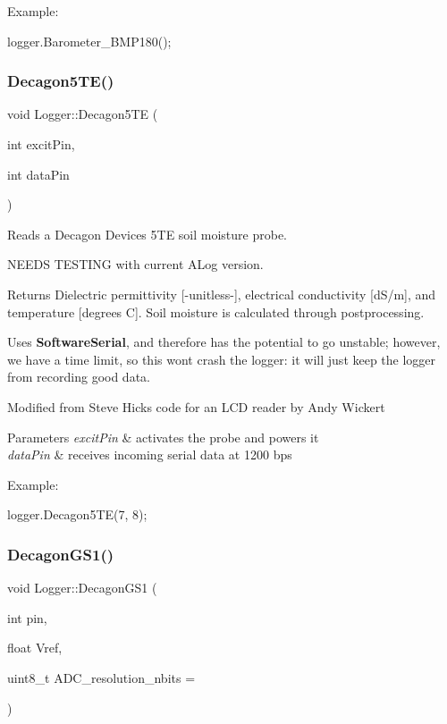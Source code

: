 Example\+: 
\begin{DoxyCode}
logger.Barometer\_BMP180();
\end{DoxyCode}
\mbox{\label{classLogger_a40ae372dee7f672a6d6f33ab441e4da1}} 
\subsubsection{\texorpdfstring{Decagon5\+T\+E()}{Decagon5TE()}}
{\footnotesize\ttfamily void Logger\+::\+Decagon5\+TE (\begin{DoxyParamCaption}\item[{int}]{excit\+Pin,  }\item[{int}]{data\+Pin }\end{DoxyParamCaption})}

Reads a Decagon Devices 5\+TE soil moisture probe.

N\+E\+E\+DS T\+E\+S\+T\+I\+NG with current A\+Log version.

Returns Dielectric permittivity \mbox{[}-\/unitless-\/\mbox{]}, electrical conductivity \mbox{[}d\+S/m\mbox{]}, and temperature \mbox{[}degrees C\mbox{]}. Soil moisture is calculated through postprocessing.

Uses {\bfseries Software\+Serial}, and therefore has the potential to go unstable; however, we have a time limit, so this won\textquotesingle{}t crash the logger\+: it will just keep the logger from recording good data.

Modified from Steve Hicks\textquotesingle{} code for an L\+CD reader by Andy Wickert


\begin{DoxyParams}{Parameters}
{\em excit\+Pin} & activates the probe and powers it\\
\hline
{\em data\+Pin} & receives incoming serial data at 1200 bps\\
\hline
\end{DoxyParams}
Example\+: 
\begin{DoxyCode}
logger.Decagon5TE(7, 8);
\end{DoxyCode}
\mbox{\label{classLogger_a84da6a9ec3d4d56fdc32d950b71f1a26}} 
\subsubsection{\texorpdfstring{Decagon\+G\+S1()}{DecagonGS1()}}
{\footnotesize\ttfamily void Logger\+::\+Decagon\+G\+S1 (\begin{DoxyParamCaption}\item[{int}]{pin,  }\item[{float}]{Vref,  }\item[{uint8\+\_\+t}]{A\+D\+C\+\_\+resolution\+\_\+nbits = {} }\end{DoxyParamCaption})}

